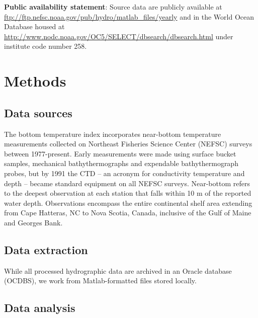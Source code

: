 \documentclass[
]{book}
\begin{document}
\textbf{Public availability statement}: Source data are publicly available at \url{ftp://ftp.nefsc.noaa.gov/pub/hydro/matlab_files/yearly} and in the World Ocean Database housed at \url{http://www.nodc.noaa.gov/OC5/SELECT/dbsearch/dbsearch.html} under institute code number 258.

\hypertarget{methods-4}{%
\section{Methods}\label{methods-4}}

\hypertarget{data-sources-4}{%
\subsection{Data sources}\label{data-sources-4}}

The bottom temperature index incorporates near-bottom temperature measurements collected on Northeast Fisheries Science Center (NEFSC) surveys between 1977-present. Early measurements were made using surface bucket samples, mechanical bathythermographs and expendable bathythermograph probes, but by 1991 the CTD -- an acronym for conductivity temperature and depth -- became standard equipment on all NEFSC surveys. Near-bottom refers to the deepest observation at each station that falls within 10 m of the reported water depth. Observations encompass the entire continental shelf area extending from Cape Hatteras, NC to Nova Scotia, Canada, inclusive of the Gulf of Maine and Georges Bank.

\hypertarget{data-extraction-4}{%
\subsection{Data extraction}\label{data-extraction-4}}

While all processed hydrographic data are archived in an Oracle database (OCDBS), we work from Matlab-formatted files stored locally.

\hypertarget{data-analysis-3}{%
\subsection{Data analysis}\label{data-analysis-3}}
\end{document}
